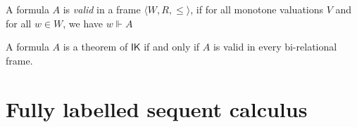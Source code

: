 \documentclass[twoside]{aiml20}
\newcommand*{\fm}[1]{#1}%
\newcommand*{\lb}[1]{#1}%
\newcommand*{\IK}{\mathsf{IK}}
\begin{document}
\begin{definition}
	A formula $\fm A$ is \emph{valid} in a frame $\langle W, R, \le \rangle$, if for all monotone valuations $V$ and for all $\lb w \in W$, we have $\lb w \Vdash \fm A$
\end{definition}


\begin{theorem}\label{thm:plotkin}
	A formula $\fm A$ is a theorem of $\IK$ if and only if $\fm A$ is valid in every bi-relational frame.
\end{theorem}

\section{Fully labelled sequent calculus}\label{sec:labelled}
\end{document}

